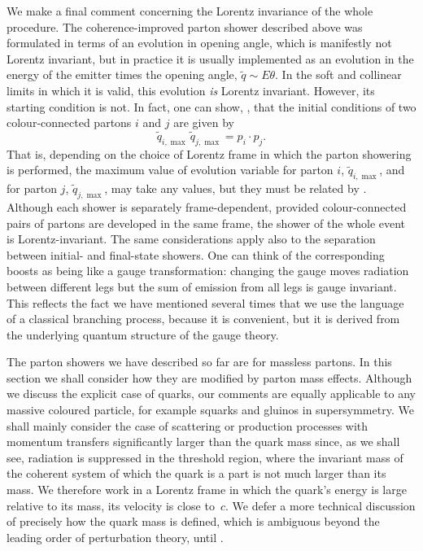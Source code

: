 We
make a final comment concerning the Lorentz invariance of the whole
procedure.  The coherence-improved parton shower described above was
formulated in terms of an evolution in opening angle, which is
manifestly not Lorentz invariant, but in practice it is usually
implemented as an evolution in the energy of the emitter times the
opening angle, $\tilde{q}\sim E\theta$.  In the soft and collinear
limits in which it is valid, this evolution \emph{is\/} Lorentz
invariant.  However, its starting condition is not.  In fact, one can
show, \cite{Ellis:1986bv}, that the initial conditions of two
colour-connected partons $i$ and $j$ are given by
\begin{equation}
  \label{eq:psinitialconditions}
  \tilde{q}_{i,\max}\,\tilde{q}_{j,\max} = p_i\cdot p_j.
\end{equation}
That is, depending on the choice of Lorentz frame in which the parton
showering is performed, the maximum value of evolution variable for
parton $i$, $\tilde{q}_{i,\max}$, and for parton $j$,
$\tilde{q}_{j,\max}$, may take any values, but they must be related by
.  Although each shower is separately
frame-dependent, provided
colour-connected pairs of partons are developed in the same frame, the
shower of the whole event is Lorentz-invariant.  The same considerations
apply also to the separation between initial- and final-state showers.
One can think of the corresponding boosts as being like a gauge
transformation: changing the gauge moves radiation between different
legs but the sum of emission from all legs is gauge invariant.  This
reflects the fact we have mentioned several times that we use the
language of a classical branching process, because it is convenient, but
it is derived from the underlying quantum structure of the gauge theory.

The parton showers we have described so far are for massless partons.
In this section we shall consider how they are modified by parton mass
effects.  Although we discuss the explicit case of quarks, our comments
are equally applicable to any massive coloured particle, for example
squarks and gluinos in supersymmetry.  We shall mainly consider the case
of scattering or production processes with momentum transfers
significantly larger than the quark mass since, as we shall see,
radiation is suppressed in the threshold region, where the invariant
mass of the coherent system of which the quark is a part is not much
larger than its mass.  We therefore work in a
Lorentz frame in which the quark's energy is large relative to its mass,
\ie its velocity is close to~$c$.  We defer a more technical
discussion of precisely how the quark mass is defined, which is
ambiguous beyond the leading order of perturbation theory, until
.


